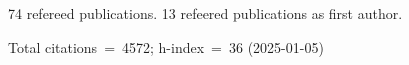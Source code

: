 74 refereed publications. 13 refeered publications as first author.

Total citations~=~4572; h-index~=~36 (2025-01-05)